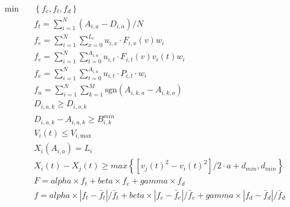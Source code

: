 \begin{align}
  \min\quad & \left\{f_{e} , f_{t} , f_{d}\right\} \tag{eq\_0001} \\
  & f_{t} = \sum_{i = 1}^{N} \left(A_{i , a} - D_{i , a}\right) / N \tag{eq\_0002} \\
  & f_{e} = \sum_{i = 1}^{N} \sum_{x = 0}^{L_{i}} u_{i , x} \cdot F_{i , x} \left(v\right) w_{i} \tag{eq\_0003\_a} \\
  & f_{e} = \sum_{i = 1}^{N} \sum_{t = 0}^{A_{i , a}} u_{i , t} \cdot F_{i , t} \left(v\right) v_{i} \left(t\right) w_{i} \tag{eq\_0003\_b} \\
  & f_{e} = \sum_{i = 1}^{N} \sum_{t = 0}^{A_{i , a}} u_{i , t} \cdot P_{i , t} \cdot w_{i} \tag{eq\_0003\_c} \\
  & f_{n} = \sum_{i = 1}^{N} \sum_{k = 1}^{M} \text{sgn} \left(A_{i , k , a} - A_{i , k , o}\right) \tag{eq\_0004} \\
  & D_{i , a , k} \geq D_{i , o , k} \tag{eq\_0005} \\
  & D_{i , a , k} - A_{i , a , k} \geq B_{i , k}^{min} \tag{eq\_0006} \\
  & V_{i} \left(t\right) \leq V_{i ,\text{max}} \tag{eq\_0007} \\
  & X_{i} \left(A_{i , a}\right) = L_{i} \tag{eq\_0010} \\
  & X_{i} \left(t\right) - X_{j} \left(t\right) \geq max \left\{\left[v_{j} \left(t\right)^{2} - v_{i} \left(t\right)^{2}\right] / 2 \cdot a + d_{min} , d_{min}\right\} \tag{eq\_0011} \\
  & F = \mathit{alpha} \times f_{t} + \mathit{beta} \times f_{e} + \mathit{gamma} \times f_{d} \tag{eq\_0015} \\
  & f = \mathit{alpha} \times \left|f_{t} - \bar{f}_{t}\right| / \bar{f}_{t} + \mathit{beta} \times \left|f_{e} - \bar{f}_{e}\right| / \bar{f}_{e} + \mathit{gamma} \times \left|f_{d} - \bar{f}_{d}\right| / \bar{f}_{d} \tag{eq\_0016} \\
\end{align}
